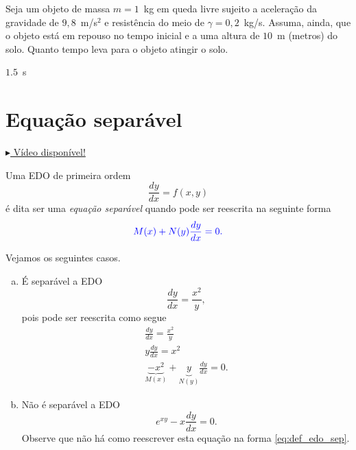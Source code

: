 \begin{exer}
  Seja um objeto de massa $m = 1$~kg em queda livre sujeito a aceleração da gravidade de $9,8$~m/s$^2$ e resistência do meio de $\gamma = 0,2$~kg/s. Assuma, ainda, que o objeto está em repouso no tempo inicial e a uma altura de $10$~m (metros) do solo. Quanto tempo leva para o objeto atingir o solo.
\end{exer}
\begin{resp}
  $1.5$~s
\end{resp}

\section{Equação separável}\label{cap_edo1ordem_sec_eqsep}

\begin{flushright}
  \href{https://archive.org/details/edo-ordem-1-separavel}{$\blacktriangleright$ Vídeo disponível!}
\end{flushright}

Uma EDO de primeira ordem
\begin{equation}
  \frac{dy}{dx} = f(x,y)
\end{equation}
é dita ser uma \emph{equação separável} quando pode ser reescrita na seguinte forma
\begin{equation}\label{eq:def_edo_sep}
  {\color{blue} M(x) + N(y)\frac{dy}{dx} = 0.}
\end{equation}

\begin{ex}\label{ex:edo_sep_def}
  Vejamos os seguintes casos.
  \begin{enumerate}[a)]
  \item É separável a EDO
    \begin{equation}
      \frac{dy}{dx} = \frac{x^2}{y},
    \end{equation}
    pois pode ser reescrita como segue
    \begin{gather}
      \frac{dy}{dx} = \frac{x^2}{y} \\
      y\frac{dy}{dx} = x^2 \\
      \underbrace{-x^2}_{M(x)} + \underbrace{y}_{N(y)}\frac{dy}{dx} = 0.
    \end{gather}
  \item Não é separável a EDO
    \begin{equation}
      e^{xy} - x\frac{dy}{dx} = 0.
    \end{equation}
    Observe que não há como reescrever esta equação na forma \eqref{eq:def_edo_sep}.
  \end{enumerate}
\end{ex}

